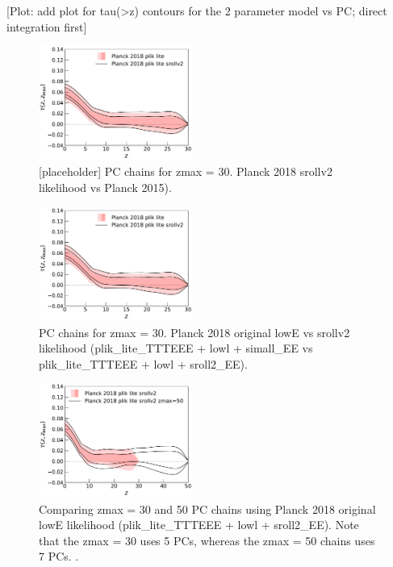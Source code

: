 \documentclass[prd,twocolumn,amsmath,amssymb,floatfix,superscriptaddress,nofootinbib]{revtex4-1}
\begin{document}
[Plot: add plot for tau(>z) contours for the 2 parameter model vs PC; direct integration first]

\begin{figure}[ht]
\includegraphics[width=0.45\textwidth]{results/direct_mcmc/pl18_plots_zmax30/plot_pub_tau_gtz_dz_0p1_pl18_pc_zmax30_pliklite_post_0930_and_pl18_pc_zmax30_pliklite_srollv2_0930.pdf}
\caption{[placeholder] PC chains for zmax = 30. Planck 2018 srollv2 likelihood vs Planck 2015).
}
\label{fig:}
\end{figure}

\begin{figure}[ht]
\includegraphics[width=0.45\textwidth]{results/direct_mcmc/pl18_plots_zmax30/plot_pub_tau_gtz_dz_0p1_pl18_pc_zmax30_pliklite_post_0930_and_pl18_pc_zmax30_pliklite_srollv2_0930.pdf}
\caption{PC chains for zmax = 30. Planck 2018 original lowE vs srollv2 likelihood (plik\_lite\_TTTEEE + lowl + simall\_EE vs plik\_lite\_TTTEEE + lowl + sroll2\_EE).
}
\label{fig:}
\end{figure}

\begin{figure}[ht]
\includegraphics[width=0.45\textwidth]{results/direct_mcmc/pl18_plots_zmax30/plot_pub_tau_gtz_dz_0p1_pl18_pc_zmax30_pliklite_srollv2_0930_and_pl18_pc_zmax50_pliklite_srollv2.pdf}
\caption{Comparing zmax = 30 and 50 PC chains using Planck 2018 original lowE likelihood (plik\_lite\_TTTEEE + lowl + sroll2\_EE). Note that the zmax = 30 uses 5 PCs, whereas the zmax = 50 chains uses 7 PCs. .
}
\label{fig:}
\end{figure}
\end{document}
